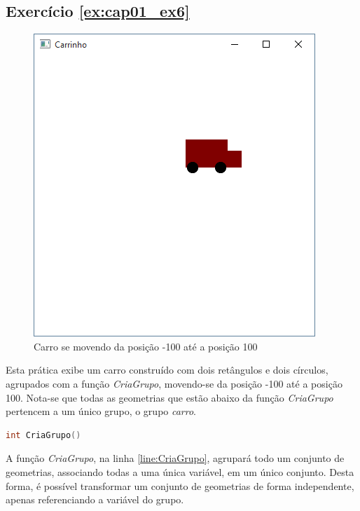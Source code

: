\subsection*{Exercício \ref{ex:cap01_ex6}}
\begin{figure}[ht]
  \centerline{\includegraphics[width=.5\textwidth]{img/cap1_ex5.png}}
  \caption{Carro se movendo da posição -100 até a posição 100}
  \label{fig:cap01_ex6}
\end{figure}
Esta prática exibe um carro construído com dois retângulos e dois círculos, agrupados com a função \emph{CriaGrupo}, movendo-se da posição -100 até a posição 100. Nota-se que todas as geometrias que estão abaixo da função \emph{CriaGrupo} pertencem a um único grupo, o grupo \emph{carro}.


\begin{lstlisting}[label={func:CriaGrupo},language=C++]
int CriaGrupo()
\end{lstlisting}
A função \emph{CriaGrupo}, na linha \ref{line:CriaGrupo}, agrupará todo um conjunto de geometrias, associando todas a uma única variável, em um único conjunto. Desta forma, é possível transformar um conjunto de geometrias de forma independente, apenas referenciando a variável do grupo.

